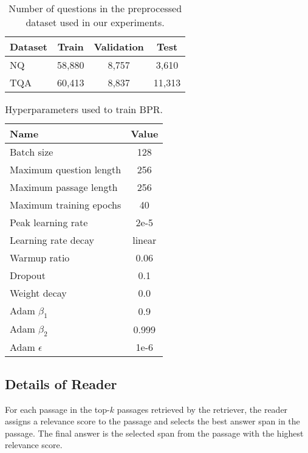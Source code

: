 \documentclass[11pt,a4paper]{article}
\begin{document}
\begin{table}[t]
  \centering
  \small{
    \begin{tabular}{l|ccc}
      \toprule
      \textbf{Dataset}  & \textbf{Train} & \textbf{Validation} & \textbf{Test} \\
      \midrule
      NQ & 58,880         & 8,757                & 3,610         \\
      TQA          & 60,413         & 8,837                & 11,313        \\
      \bottomrule
    \end{tabular}
  }
    \caption{Number of questions in the preprocessed dataset used in our experiments.}
  \label{tb:dataset-details}
\end{table}

\begin{table}[t]
  \centering
  \small{
    \begin{tabular}{l|c}
      \toprule
      \textbf{Name}                    & \textbf{Value}  \\
      \midrule
      Batch size              & 128    \\
      Maximum question length & 256    \\
      Maximum passage length  & 256    \\
      Maximum training epochs & 40 \\
      Peak learning rate      & 2e-5   \\
      Learning rate decay     & linear \\
      Warmup ratio            & 0.06   \\
      Dropout                 & 0.1    \\
      Weight decay            & 0.0    \\
      Adam $\beta_1$          & 0.9    \\
      Adam $\beta_2$          & 0.999  \\
      Adam $\epsilon$         & 1e-6   \\
      \bottomrule
    \end{tabular}
  }
  \caption{Hyperparameters used to train BPR.}
  \label{tb:biencoder-hyper-params}
\end{table}

\subsection{Details of Reader}
\label{sec:reader}

For each passage in the top-$k$ passages retrieved by the retriever, the reader assigns a relevance score to the passage and selects the best answer span in the passage.
The final answer is the selected span from the passage with the highest relevance score.
\end{document}
